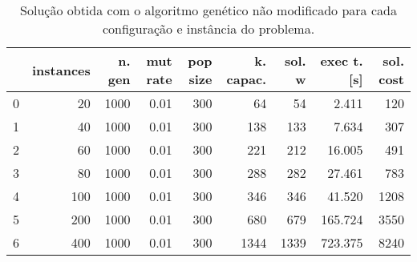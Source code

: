 \begin{table}[H]
\centering
\begin{tabular}{lrrrrrrrr}
\toprule
{} &  instances &  n. gen &  mut rate &  pop size &  k. capac. &  sol. w &  exec t. [s] &  sol. cost \\
\midrule
0 &         20 &    1000 &      0.01 &       300 &         64 &      54 &        2.411 &        120 \\
1 &         40 &    1000 &      0.01 &       300 &        138 &     133 &        7.634 &        307 \\
2 &         60 &    1000 &      0.01 &       300 &        221 &     212 &       16.005 &        491 \\
3 &         80 &    1000 &      0.01 &       300 &        288 &     282 &       27.461 &        783 \\
4 &        100 &    1000 &      0.01 &       300 &        346 &     346 &       41.520 &       1208 \\
5 &        200 &    1000 &      0.01 &       300 &        680 &     679 &      165.724 &       3550 \\
6 &        400 &    1000 &      0.01 &       300 &       1344 &    1339 &      723.375 &       8240 \\
\bottomrule
\end{tabular}
\caption{Solução obtida com o algoritmo genético não modificado para cada configuração e instância do problema.}
\label{table:result-vanilla-population-300}
\end{table}